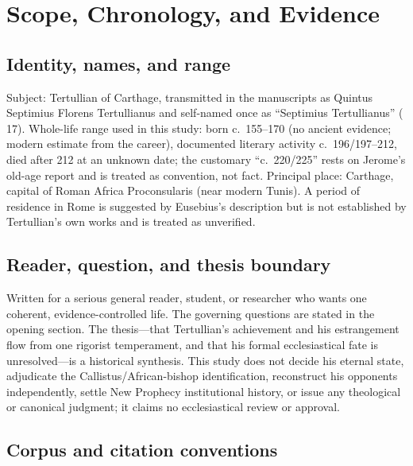 \section{Scope, Chronology, and Evidence}

\subsection{Identity, names, and range}

Subject: Tertullian of Carthage, transmitted in the manuscripts as Quintus
Septimius Florens Tertullianus and self-named once as ``Septimius
Tertullianus'' ( 17). Whole-life range used in
this study: born c.~155--170 (no ancient evidence; modern estimate from the
career), documented literary activity c.~196/197--212, died after 212 at an
unknown date; the customary ``c.~220/225'' rests on Jerome's old-age report
and is treated as convention, not fact. Principal place: Carthage, capital of
Roman Africa Proconsularis (near modern Tunis). A period of residence in Rome is suggested
by Eusebius's description but is not established by Tertullian's own works and
is treated as unverified.

\subsection{Reader, question, and thesis boundary}

Written for a serious general reader, student, or researcher who wants one
coherent, evidence-controlled life. The governing questions are stated in the
opening section. The thesis---that Tertullian's achievement and his
estrangement flow from one rigorist temperament, and that his formal
ecclesiastical fate is unresolved---is a historical synthesis. This study does
not decide his eternal state, adjudicate the Callistus/African-bishop
identification, reconstruct his opponents independently, settle New Prophecy
institutional history, or issue any theological or canonical judgment; it
claims no ecclesiastical review or approval.

\subsection{Corpus and citation conventions}

